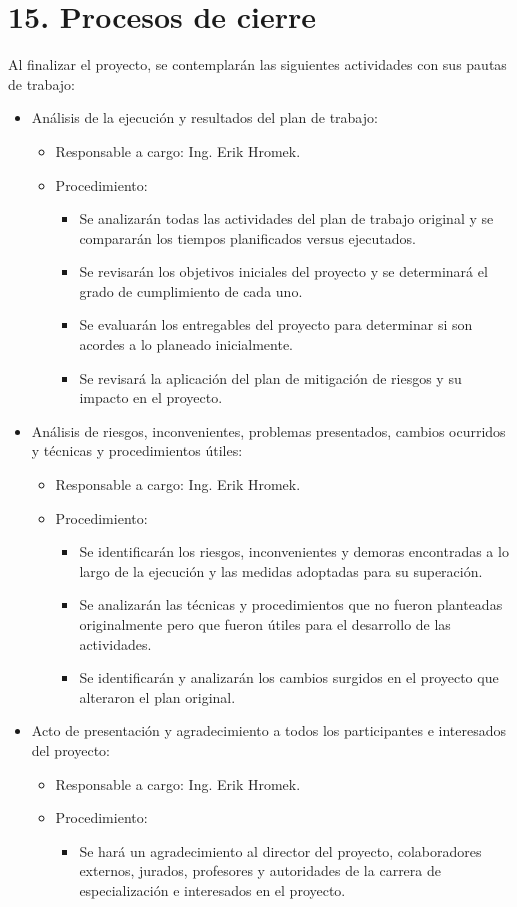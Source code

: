 \documentclass[
11pt, %
]{charter}
\begin{document}
\section{15. Procesos de cierre}    
\label{sec:cierre}

Al finalizar el proyecto, se contemplarán las siguientes actividades con sus pautas de trabajo:
\begin{itemize}
	\item Análisis de la ejecución y resultados del plan de trabajo:
	\begin{itemize}
		\item Responsable a cargo: Ing. Erik Hromek. 
		\item Procedimiento: 
		\begin{itemize}
		\item Se analizarán todas las actividades del plan de trabajo original y se compararán los tiempos planificados versus ejecutados.
		\item Se revisarán los objetivos iniciales del proyecto y se determinará el grado de cumplimiento de cada uno.	
		\item Se evaluarán los entregables del proyecto para determinar si son acordes a lo planeado inicialmente.
		\item Se revisará la aplicación del plan de mitigación de riesgos y su impacto en el proyecto.
		\end{itemize}
	\end{itemize}
	\item Análisis de riesgos, inconvenientes, problemas presentados, cambios ocurridos y técnicas y procedimientos útiles:
	\begin{itemize}
		\item Responsable a cargo: Ing. Erik Hromek. 
		\item Procedimiento: 
		\begin{itemize}
		\item Se identificarán los riesgos, inconvenientes y demoras encontradas a lo largo de la ejecución y las medidas adoptadas para su superación.
		\item Se analizarán las técnicas y procedimientos que no fueron planteadas originalmente pero que fueron útiles para el desarrollo de las actividades.
		\item Se identificarán y analizarán los cambios surgidos en el proyecto que alteraron el plan original.
		\end{itemize}
	\end{itemize}
	\item Acto de presentación y agradecimiento a todos los participantes e interesados del proyecto:
	\begin{itemize}
		\item Responsable a cargo: Ing. Erik Hromek. 
		\item Procedimiento: 
		\begin{itemize}
		\item Se hará un agradecimiento al director del proyecto, colaboradores externos, jurados, profesores y autoridades de la carrera de especialización e 					interesados en el proyecto. 
		\end{itemize}
	\end{itemize}
\end{itemize}
\end{document}
